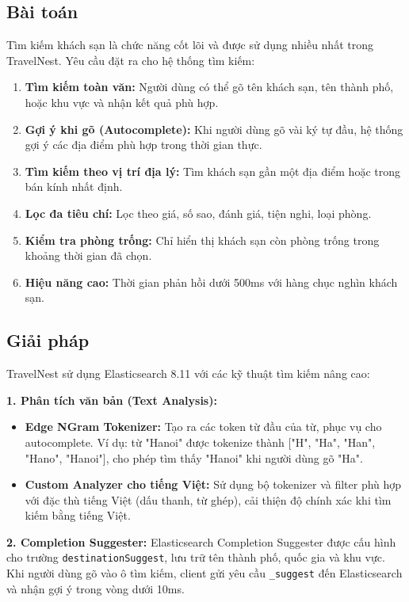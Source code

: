 \documentclass[13pt,a4paper,twoside]{report}
\begin{document}
\subsection{Bài toán}

Tìm kiếm khách sạn là chức năng cốt lõi và được sử dụng nhiều nhất trong TravelNest. Yêu cầu đặt ra cho hệ thống tìm kiếm:

\begin{enumerate}
  \item \textbf{Tìm kiếm toàn văn:} Người dùng có thể gõ tên khách sạn, tên thành phố, hoặc khu vực và nhận kết quả phù hợp.
  \item \textbf{Gợi ý khi gõ (Autocomplete):} Khi người dùng gõ vài ký tự đầu, hệ thống gợi ý các địa điểm phù hợp trong thời gian thực.
  \item \textbf{Tìm kiếm theo vị trí địa lý:} Tìm khách sạn gần một địa điểm hoặc trong bán kính nhất định.
  \item \textbf{Lọc đa tiêu chí:} Lọc theo giá, số sao, đánh giá, tiện nghi, loại phòng.
  \item \textbf{Kiểm tra phòng trống:} Chỉ hiển thị khách sạn còn phòng trống trong khoảng thời gian đã chọn.
  \item \textbf{Hiệu năng cao:} Thời gian phản hồi dưới 500ms với hàng chục nghìn khách sạn.
\end{enumerate}

\subsection{Giải pháp}

TravelNest sử dụng Elasticsearch 8.11 với các kỹ thuật tìm kiếm nâng cao:

\textbf{1. Phân tích văn bản (Text Analysis):}
\begin{itemize}
  \item \textbf{Edge NGram Tokenizer:} Tạo ra các token từ đầu của từ, phục vụ cho autocomplete. Ví dụ: từ "Hanoi" được tokenize thành ["H", "Ha", "Han", "Hano", "Hanoi"], cho phép tìm thấy "Hanoi" khi người dùng gõ "Ha".
  \item \textbf{Custom Analyzer cho tiếng Việt:} Sử dụng bộ tokenizer và filter phù hợp với đặc thù tiếng Việt (dấu thanh, từ ghép), cải thiện độ chính xác khi tìm kiếm bằng tiếng Việt.
\end{itemize}

\textbf{2. Completion Suggester:}
Elasticsearch Completion Suggester được cấu hình cho trường \texttt{destinationSuggest}, lưu trữ tên thành phố, quốc gia và khu vực. Khi người dùng gõ vào ô tìm kiếm, client gửi yêu cầu \texttt{\_suggest} đến Elasticsearch và nhận gợi ý trong vòng dưới 10ms.
\end{document}
